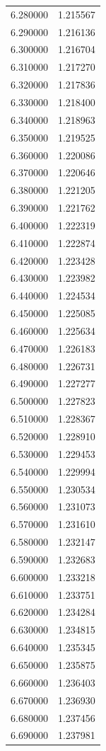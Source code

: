\begin{tabular}{rr}
6.280000 & 1.215567 \\
6.290000 & 1.216136 \\
6.300000 & 1.216704 \\
6.310000 & 1.217270 \\
6.320000 & 1.217836 \\
6.330000 & 1.218400 \\
6.340000 & 1.218963 \\
6.350000 & 1.219525 \\
6.360000 & 1.220086 \\
6.370000 & 1.220646 \\
6.380000 & 1.221205 \\
6.390000 & 1.221762 \\
6.400000 & 1.222319 \\
6.410000 & 1.222874 \\
6.420000 & 1.223428 \\
6.430000 & 1.223982 \\
6.440000 & 1.224534 \\
6.450000 & 1.225085 \\
6.460000 & 1.225634 \\
6.470000 & 1.226183 \\
6.480000 & 1.226731 \\
6.490000 & 1.227277 \\
6.500000 & 1.227823 \\
6.510000 & 1.228367 \\
6.520000 & 1.228910 \\
6.530000 & 1.229453 \\
6.540000 & 1.229994 \\
6.550000 & 1.230534 \\
6.560000 & 1.231073 \\
6.570000 & 1.231610 \\
6.580000 & 1.232147 \\
6.590000 & 1.232683 \\
6.600000 & 1.233218 \\
6.610000 & 1.233751 \\
6.620000 & 1.234284 \\
6.630000 & 1.234815 \\
6.640000 & 1.235345 \\
6.650000 & 1.235875 \\
6.660000 & 1.236403 \\
6.670000 & 1.236930 \\
6.680000 & 1.237456 \\
6.690000 & 1.237981 \\

\end{tabular}
